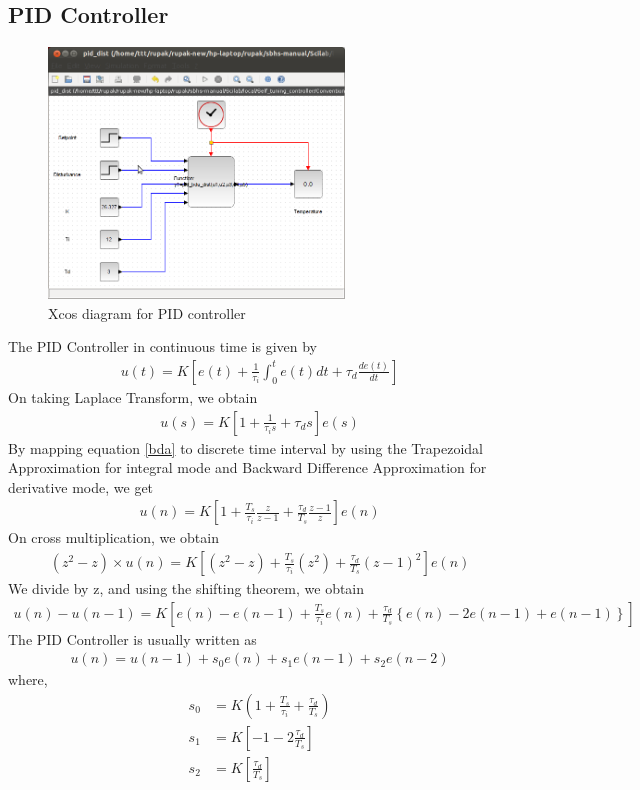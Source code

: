 \subsection{PID Controller}
\begin{figure}[h]
\centering
	\includegraphics[width =0.7\textwidth]{Vikas_self/report_tex/implementation/pid_dist.png}
		\caption{Xcos diagram for PID controller}
	\label{PID}
\end{figure}

The PID Controller in continuous time is given by
\begin{align}
	u(t) = K \left[e(t) + \frac 1{\tau_i}\int_0^t e(t)dt + \tau_d \frac{de(t)}{dt}\right]
\end{align}
On taking Laplace Transform, we obtain
\begin{align} \label{bda}
	u(s) = K \left[1 + \frac 1{\tau_i s} + \tau_d s\right]e(s)
\end{align}
By mapping equation \ref{bda} to discrete time interval by using the Trapezoidal Approximation for integral mode and 
Backward Difference Approximation for derivative mode, we get
\begin{align}
	u(n) = K \left[1 + \frac{T_s}{\tau_i} \frac{z}{z-1} + \frac{\tau_d}{T_s} \frac{z-1}{z}\right]e(n)
\end{align}
On cross multiplication, we obtain
\begin{align}
	(z^2-z)\times u(n) = K \left[(z^2-z) + \frac{T_s}{\tau_i} (z^2) + \frac{\tau_d}{T_s} (z-1)^2\right]e(n)
\end{align}
We divide by z, and using the shifting theorem, we obtain
\begin{align}
	 u(n) - u(n-1) = K \left[e(n) - e(n-1) + \frac{T_s}{\tau_i} e(n) + \frac{\tau_d}{T_s}\left\{e(n) - 2e(n-1) + e(n-1)\right\}\right]
\end{align}
The PID Controller is usually written as
\begin{align}
	 u(n) = u(n-1) + s_0 e(n) + s_1 e(n-1) + s_2 e(n-2)
\end{align}
where,
\begin{align}
s_0 &= K\left(1+ \frac{T_s}{\tau_i} + \frac{\tau_d}{T_s}\right)\\
s_1 &= K\left[-1 - 2\frac{\tau_d}{T_s}\right]\\
s_2 &= K\left[\frac{\tau_d}{T_s}\right]
\end{align}


